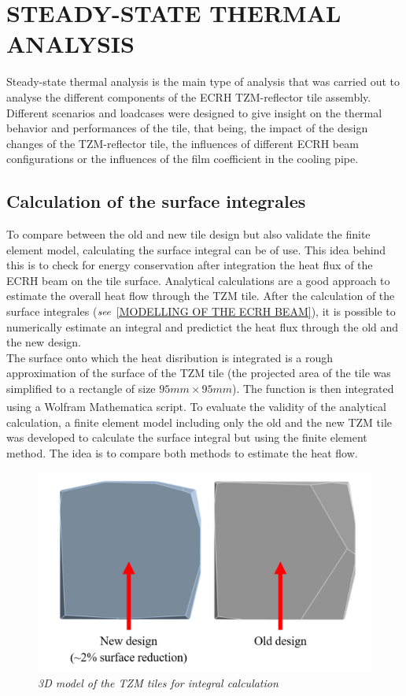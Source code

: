 \section{STEADY-STATE THERMAL ANALYSIS}
\normalsize{Steady-state thermal analysis is the main type of analysis that was carried out to analyse the different components of the \acrshort{ECRH} \acrshort{TZM}-reflector tile assembly. Different scenarios and loadcases were designed to give insight on the thermal behavior and performances of the tile, that being, the impact of the design changes of the \acrshort{TZM}-reflector tile, the influences of different \acrshort{ECRH} beam configurations or the influences of the film coefficient in the cooling pipe.}
\subsection{Calculation of the surface integrales} \label{Calculation of the surface integrales}
\normalsize{To compare between the old and new tile design but also validate the finite element model, calculating the surface integral can be of use. This idea behind this is to check for energy conservation after integration the heat flux of the \acrshort{ECRH} beam on the tile surface. Analytical calculations are a good approach to estimate the overall heat flow through the \acrshort{TZM} tile. After the calculation of the surface integrales ($\it{see}$ \ref{MODELLING OF THE ECRH BEAM}), it is possible to numerically estimate an integral and predictict the heat flux through the old and the new design.}
\\
\break
\normalsize{\indent The surface onto which the heat disribution is integrated is a rough approximation of the surface of the \acrshort{TZM} tile (the projected area of the tile was simplified to a rectangle of size $95mm \times 95mm$). The function is then integrated using a Wolfram Mathematica\textsuperscript{\textregistered} script. To evaluate the validity of the analytical calculation, a finite element model including only the old and the new \acrshort{TZM} tile was developed to calculate the surface integral but using the finite element method. The idea is to compare both methods to estimate the heat flow. }
\\
\begin{figure}[h!]
    \label{fig_5_1} 
    \centering
    \includegraphics[width=.7\textwidth]{figures/standalonetilemodel.png}
    \caption{\it 3D model of the TZM tiles for integral calculation}
\end{figure}
